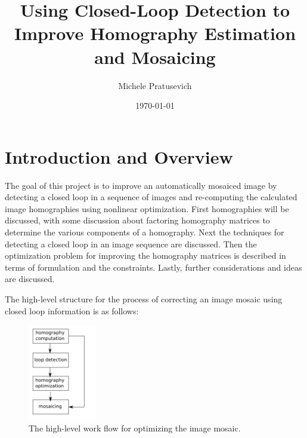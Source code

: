 \documentclass{article}
\title{Using Closed-Loop Detection to Improve Homography Estimation and Mosaicing}
\author{Michele Pratusevich}
\date{\today}
\begin{document}
 
\maketitle
\tableofcontents

%
%

\section{Introduction and Overview}

The goal of this project is to improve an automatically mosaiced image by
detecting a closed loop in a sequence of images and re-computing the calculated
image homographies using nonlinear optimization. First homographies will be
discussed, with some discussion about factoring homography matrices to
determine the various components of a homography. Next the techniques for
detecting a closed loop in an image sequence are discussed. Then the
optimization problem for improving the homography matrices is described in
terms of formulation and the constraints. Lastly, further considerations and
ideas are discussed. 

The high-level structure for the process of correcting an image mosaic using
closed loop information is as follows:

\begin{figure}[h!]
\centering
\includegraphics[width=3cm]{highleveldiaf.png}
\caption{The high-level work flow for optimizing the image mosaic.}
\end{figure}
\end{document}
